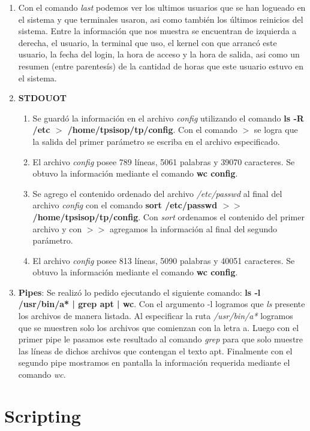 \documentclass[a4paper,11pt] {article}
\begin{document}
\begin{enumerate}
	\item Con el comando \textit{last} podemos ver los ultimos usuarios que se han logueado en el sistema y que 	terminales usaron, asi como tambi\'en los \'ultimos reinicios del sistema. Entre la informaci\'on que nos muestra se 	encuentran de izquierda a derecha, el usuario, la terminal que uso, el kernel con que arranc\'o este usuario, la 	fecha del login, la hora de acceso y la hora de salida, asi como un resumen (entre parentes\'is) de la cantidad de 	horas que este usuario estuvo en el sistema.
	\item \textbf{STDOUOT}
		\begin{enumerate}
			\item Se guard\'o la informaci\'on en el archivo \textit{config} utilizando el comando \textbf{ls -R /etc 			$>$ /home/tpsisop/tp/config}. Con el comando $>$ se logra que la salida del primer par\'ametro se escriba 			en el archivo especificado.
			\item El archivo \textit{config} posee 789 l\'ineas, 5061 palabras y 39070 caracteres. Se obtuvo la 				informaci\'on mediante el comando \textbf{wc config}.
			\item Se agrego el contenido ordenado del archivo \textit{/etc/passwd} al final del archivo \textit				{config} con el comando \textbf{sort /etc/passwd $>>$ /home/tpsisop/tp/config}. Con \textit{sort} 				ordenamos el contenido del primer archivo y con $>>$ agregamos la informaci\'on al final del segundo par\'ametro.
			\item El archivo \textit{config} posee 813 l\'ineas, 5090 palabras y 40051 caracteres. Se obtuvo la 				informaci\'on mediante el comando \textbf{wc config}.
		\end{enumerate}
	\item \textbf{Pipes}: Se realiz\'o lo pedido ejecutando el siguiente comando: \textbf{ls -l /usr/bin/a* | grep apt | 	wc}. Con el argumento -l logramos que \textit{ls} presente los archivos de manera listada. Al especificar la ruta 	\textit{/usr/bin/a*} logramos que se muestren solo los archivos que comienzan con la letra a. Luego con el primer 	pipe le pasamos este resultado al comando \textit{grep} para que solo muestre las l\'ineas de dichos archivos que 	contengan el texto apt. Finalmente con el segundo pipe mostramos en pantalla la informaci\'on requerida mediante el 	comando \textit{wc}.
\end{enumerate}

\section*{Scripting}
\end{document}
